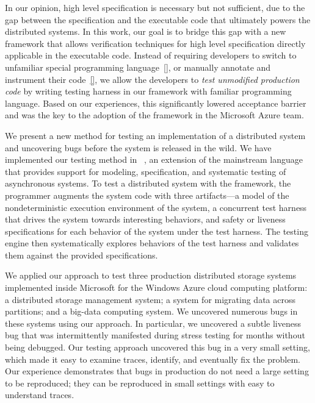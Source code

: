 In our opinion, high level specification is necessary but not sufficient, due to the gap between the specification and the executable code that ultimately powers the distributed systems. In this work, our goal is to bridge this gap with a new framework that allows verification techniques for high level specification directly applicable in the executable code. Instead of requiring developers to switch to unfamiliar special programming language~\ref{}, or manually annotate and instrument their code~\ref{}, we allow the developers to {\em test unmodified production code} by writing testing harness in our framework with familiar programming language. Based on our experiences, this significantly lowered acceptance barrier and was the key to the adoption of the framework in the Microsoft Azure team.

We present a new method for testing an implementation of a distributed system and uncovering bugs before the system is released in the wild.
We have implemented our testing method in \psharp~\cite{deligiannis2015psharp}, an extension of the mainstream language \csharp that provides
support for modeling, specification, and systematic testing of asynchronous systems.
To test a distributed system with the \psharp framework, the programmer augments the system code with three artifacts---a model of the nondeterministic execution environment of the system, a concurrent test harness that drives the system towards interesting behaviors, and safety or liveness specifications for each behavior of the system under the test harness.
The \psharp testing engine then systematically explores behaviors of the test harness and validates them against the provided specifications.

We applied our approach to test three production distributed storage systems implemented inside Microsoft for the Windows Azure cloud computing
platform: a distributed storage management system; a system for migrating data across partitions; and a big-data computing system.
We uncovered numerous bugs in these systems using our approach.
In particular, we uncovered a subtle liveness bug that was intermittently manifested during stress testing for months without being debugged.
Our testing approach uncovered this bug in a very small setting, which made it easy to examine traces, identify, and eventually fix the problem.
Our experience demonstrates that bugs in production do not need a large setting to be reproduced;
they can be reproduced in small settings with easy to understand traces.

